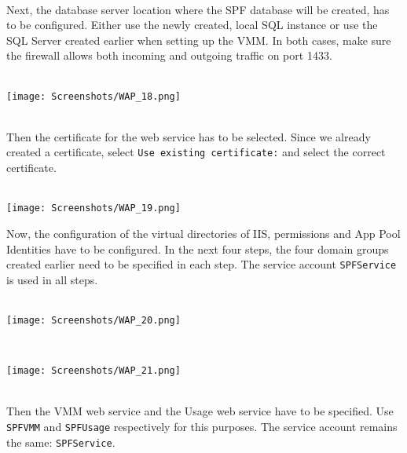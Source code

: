 $\;$ \\ \\
Next, the database server location where the SPF database will be created, has to be configured. Either use the newly created, local SQL instance or use the SQL Server created earlier when setting up the VMM. In both cases, make sure the firewall allows both incoming and outgoing traffic on port 1433.
$\;$ \\ \\
\noindent\begin{minipage}{\textwidth}
    \centering
    \texttt{[image: Screenshots/WAP\_18.png]}
\end{minipage}
$\;$ \\ \\
Then the certificate for the web service has to be selected. Since we already created a certificate, select \texttt{Use existing certificate:} and select the correct certificate.
$\;$ \\ \\
\noindent\begin{minipage}{\textwidth}
    \centering
    \texttt{[image: Screenshots/WAP\_19.png]}
\end{minipage}

\clearpage

Now, the configuration of the virtual directories of IIS, permissions and App Pool Identities have to be configured. In the next four steps, the four domain groups created earlier need to be specified in each step. The service account \texttt{SPFService} is used in all steps.
$\;$ \\ \\
\noindent\begin{minipage}{\textwidth}
    \centering
    \texttt{[image: Screenshots/WAP\_20.png]}
\end{minipage}
$\;$ \\ \\
\noindent\begin{minipage}{\textwidth}
    \centering
    \texttt{[image: Screenshots/WAP\_21.png]}
\end{minipage}
$\;$ \\ \\
Then the VMM web service and the Usage web service have to be specified. Use \texttt{SPFVMM} and \texttt{SPFUsage} respectively for this purposes. The service account remains the same: \texttt{SPFService}.

